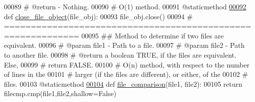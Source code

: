 \begin{DoxyCode}
00089     \textcolor{comment}{#   @return - Nothing.}
00090     \textcolor{comment}{#   O(1) method.}
00091     @staticmethod
\hypertarget{file__io_8py_source_l00092}{}\hyperlink{classutilities_1_1file__io_1_1file__io__operations_a15cce5bd7767b057cdc569f393c24866}{00092}     \textcolor{keyword}{def }\hyperlink{classutilities_1_1file__io_1_1file__io__operations_a15cce5bd7767b057cdc569f393c24866}{close\_file\_object}(file\_obj):
00093         file\_obj.close()
00094     \textcolor{comment}{# ============================================================}
00095     \textcolor{comment}{##  Method to determine if two files are equivalent.}
00096     \textcolor{comment}{#   @param file1 - Path to a file.}
00097     \textcolor{comment}{#   @param file2 - Path to another file.}
00098     \textcolor{comment}{#   @return a boolean TRUE, if the files are equivalent. Else,}
00099     \textcolor{comment}{#       return FALSE.}
00100     \textcolor{comment}{#   O(n) method, with respect to the number of lines in the}
00101     \textcolor{comment}{#       larger (if the files are different), or either, of the}
00102     \textcolor{comment}{#       files.}
00103     @staticmethod
\hypertarget{file__io_8py_source_l00104}{}\hyperlink{classutilities_1_1file__io_1_1file__io__operations_a9b3808ff6b165f5e73b780036f73a917}{00104}     \textcolor{keyword}{def }\hyperlink{classutilities_1_1file__io_1_1file__io__operations_a9b3808ff6b165f5e73b780036f73a917}{file\_comparison}(file1, file2):
00105         \textcolor{keywordflow}{return} filecmp.cmp(file1,file2,shallow=\textcolor{keyword}{False})
\end{DoxyCode}
